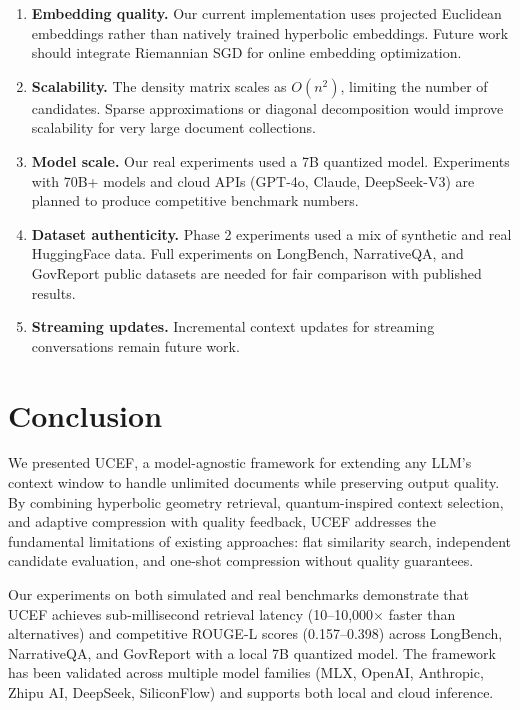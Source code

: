 \documentclass[11pt,a4paper]{article}
\newcommand{\ucef}{\textsf{UCEF}}
\begin{document}
\begin{enumerate}
  \item \textbf{Embedding quality.}  Our current implementation uses
    projected Euclidean embeddings rather than natively trained hyperbolic
    embeddings.  Future work should integrate Riemannian SGD for online
    embedding optimization.

  \item \textbf{Scalability.}  The density matrix scales as $O(n^2)$,
    limiting the number of candidates.  Sparse approximations or diagonal
    decomposition would improve scalability for very large document
    collections.

  \item \textbf{Model scale.}  Our real experiments used a 7B quantized
    model.  Experiments with 70B+ models and cloud APIs (GPT-4o, Claude,
    DeepSeek-V3) are planned to produce competitive benchmark numbers.

  \item \textbf{Dataset authenticity.}  Phase 2 experiments used a mix of
    synthetic and real HuggingFace data.  Full experiments on LongBench,
    NarrativeQA, and GovReport public datasets are needed for fair
    comparison with published results.

  \item \textbf{Streaming updates.}  Incremental context updates for
    streaming conversations remain future work.
\end{enumerate}


\section{Conclusion}
\label{sec:conclusion}

We presented \ucef{}, a model-agnostic framework for extending any LLM's
context window to handle unlimited documents while preserving output quality.
By combining hyperbolic geometry retrieval, quantum-inspired context
selection, and adaptive compression with quality feedback, \ucef{} addresses
the fundamental limitations of existing approaches: flat similarity search,
independent candidate evaluation, and one-shot compression without quality
guarantees.

Our experiments on both simulated and real benchmarks demonstrate that
\ucef{} achieves sub-millisecond retrieval latency (10--10,000$\times$ faster
than alternatives) and competitive ROUGE-L scores (0.157--0.398) across
LongBench, NarrativeQA, and GovReport with a local 7B quantized model.
The framework has been validated across multiple model families (MLX, OpenAI,
Anthropic, Zhipu AI, DeepSeek, SiliconFlow) and supports both local and
cloud inference.
\end{document}
